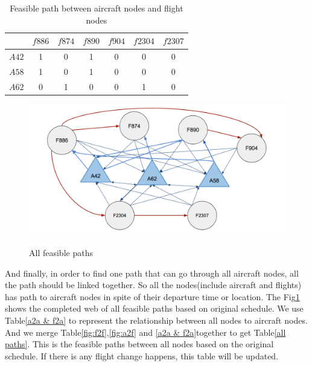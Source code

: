 \documentclass[senior]{IPSstyle}
\begin{document}
\begin{table}[h]
\renewcommand{\arraystretch}{1}
\caption{Feasible path between aircraft nodes and flight nodes}
\label{Example Feasible paths a2f}
\begin{center}
\begin{tabular}{|c|c|c|c|c|c|c|}
\hline
\multicolumn{1}{|c|}{}
&\multicolumn{1}{|c|}{\(f886\)}
&\multicolumn{1}{c|}{\(f874\)}
&\multicolumn{1}{c|}{\(f890\)}
&\multicolumn{1}{c|}{\(f904\)}
&\multicolumn{1}{c|}{\(f2304\)}
&\multicolumn{1}{c|}{\(f2307\)}
\\  \hline
\(A42\) & 1 & 0 & 1 & 0 & 0 & 0
\\	\hline
\(A58\) & 1 & 0 & 1 & 0 & 0 & 0
\\	\hline
\(A62\) & 0 & 1 & 0 & 0 & 1 & 0
\\  \hline
\end{tabular}
\end{center}
\end{table}

\begin{figure}[h]
    \centering
    \includegraphics[width=15cm]{MasterThesis-master/completed web.png}\\
    \caption{All feasible paths}
    \label{fig:all feasible paths}
\end{figure}

And finally, in order to find one path that can go through all aircraft nodes, all the path should be linked together. So all the nodes(include aircraft and flights) has path to aircraft nodes in spite of their departure time or location. The Fig\ref{fig:all feasible paths} shows the completed web of all feasible paths based on original schedule. 
We use Table\ref{a2a & f2a} to represent the relationship between all nodes to aircraft nodes. And we merge Table\ref{fig:f2f},\ref{fig:a2f} and \ref{a2a & f2a}together to get Table\ref{all paths}.
This is the feasible paths between all nodes based on the original schedule. If there is any flight change happens, this table will be updated.
\end{document}

